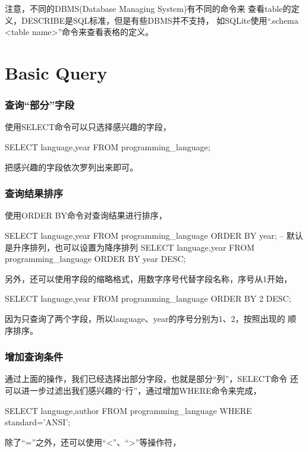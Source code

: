 \documentclass[a4paper,11pt]{article}
\begin{document}
注意，不同的DBMS(Database Managing System)有不同的命令来
查看table的定义，DESCRIBE是SQL标准，但是有些DBMS并不支持，
如SQLite使用“.schema <table name>”命令来查看表格的定义。

\part[Basic Query]{Basic Query}
\section[查询“部分”字段]{查询“部分”字段}
使用SELECT命令可以只选择感兴趣的字段，

\begin{sqlcode}
SELECT language,year FROM programming_language;
\end{sqlcode}

把感兴趣的字段依次罗列出来即可。

\section[查询结果排序]{查询结果排序}
使用ORDER BY命令对查询结果进行排序，

\begin{sqlcode}
SELECT language,year FROM programming_language ORDER BY year;
-- 默认是升序排列，也可以设置为降序排列
SELECT language,year FROM programming_language ORDER BY year DESC;
\end{sqlcode}

另外，还可以使用字段的缩略格式，用数字序号代替字段名称，序号从1开始，

\begin{sqlcode}
SELECT language,year FROM programming_language ORDER BY 2 DESC;
\end{sqlcode}

因为只查询了两个字段，所以language、year的序号分别为1、2，按照出现的
顺序排序。

\section[增加查询条件]{增加查询条件}
通过上面的操作，我们已经选择出部分字段，也就是部分“列”，SELECT命令
还可以进一步过滤出我们感兴趣的“行”，通过增加WHERE命令来完成，

\begin{sqlcode}
SELECT language,author FROM programming_language WHERE standard='ANSI';
\end{sqlcode}

除了“=”之外，还可以使用“<”、“>”等操作符，
\end{document}
